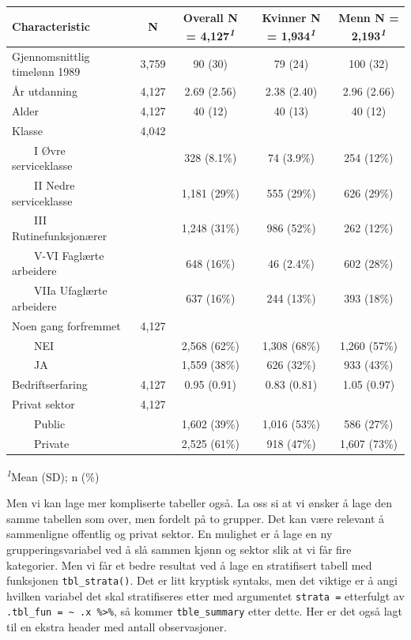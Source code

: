 \documentclass[
  norsk,
  letterpaper,
  DIV=11,
  numbers=noendperiod]{scrreprt}
\theoremstyle{definition}
\theoremstyle{remark}
\begin{document}
\begin{table}
\fontsize{12.0pt}{14.0pt}\selectfont
\begin{tabular*}{\linewidth}{@{\extracolsep{\fill}}lcccc}
\toprule
\textbf{Characteristic} & \textbf{N} & \textbf{Overall}  N = 4,127\textsuperscript{\textit{1}} & \textbf{Kvinner}  N = 1,934\textsuperscript{\textit{1}} & \textbf{Menn}  N = 2,193\textsuperscript{\textit{1}} \\ 
\midrule\addlinespace[2.5pt]
Gjennomsnittlig timelønn 1989 & 3,759 & 90 (30) & 79 (24) & 100 (32) \\ 
År utdanning & 4,127 & 2.69 (2.56) & 2.38 (2.40) & 2.96 (2.66) \\ 
Alder & 4,127 & 40 (12) & 40 (13) & 40 (12) \\ 
Klasse & 4,042 &  &  &  \\ 
    I Øvre serviceklasse &  & 328 (8.1\%) & 74 (3.9\%) & 254 (12\%) \\ 
    II Nedre serviceklasse &  & 1,181 (29\%) & 555 (29\%) & 626 (29\%) \\ 
    III Rutinefunksjonærer &  & 1,248 (31\%) & 986 (52\%) & 262 (12\%) \\ 
    V-VI Faglærte arbeidere &  & 648 (16\%) & 46 (2.4\%) & 602 (28\%) \\ 
    VIIa Ufaglærte arbeidere &  & 637 (16\%) & 244 (13\%) & 393 (18\%) \\ 
Noen gang forfremmet & 4,127 &  &  &  \\ 
    NEI &  & 2,568 (62\%) & 1,308 (68\%) & 1,260 (57\%) \\ 
    JA &  & 1,559 (38\%) & 626 (32\%) & 933 (43\%) \\ 
Bedriftserfaring & 4,127 & 0.95 (0.91) & 0.83 (0.81) & 1.05 (0.97) \\ 
Privat sektor & 4,127 &  &  &  \\ 
    Public &  & 1,602 (39\%) & 1,016 (53\%) & 586 (27\%) \\ 
    Private &  & 2,525 (61\%) & 918 (47\%) & 1,607 (73\%) \\ 
\bottomrule
\end{tabular*}
\begin{minipage}{\linewidth}
\vspace{.05em}
\textsuperscript{\textit{1}}Mean (SD); n (\%)\\
\end{minipage}
\end{table}

Men vi kan lage mer kompliserte tabeller også. La oss si at vi ønsker å
lage den samme tabellen som over, men fordelt på to grupper. Det kan
være relevant å sammenligne offentlig og privat sektor. En mulighet er å
lage en ny grupperingsvariabel ved å slå sammen kjønn og sektor slik at
vi får fire kategorier. Men vi får et bedre resultat ved å lage en
stratifisert tabell med funksjonen \texttt{tbl\_strata()}. Det er litt
kryptisk syntaks, men det viktige er å angi hvilken variabel det skal
stratifiseres etter med argumentet \texttt{strata\ =} etterfulgt av
\texttt{.tbl\_fun\ =\ \textasciitilde{}\ .x\ \%\textgreater{}\%}, så
kommer \texttt{tble\_summary} etter dette. Her er det også lagt til en
ekstra header med antall observasjoner.
\end{document}
